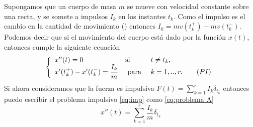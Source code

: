\begin{example} \label{ejemplo1}
    Supongamos que un cuerpo de masa $m$ se mueve con velocidad constante sobre una recta, y se somete a impulsos $I_k$ en los instantes $t_k$. Como el impulso es el cambio en la cantidad de movimiento (\cite{Serway}) entonces $I_k=mv(t_k^+)-mv(t_k^-)$. Podemos decir que si el movimiento del cuerpo está dado por la función $x(t)$, entonces cumple la siguiente ecuación 
    \begin{equation}
	\left\lbrace \begin{array}{lll} 
		\label{eq:imp}
        x''(t)=0 & \text{si }& t\neq t_k,\\
		x'(t_k^+)-x'(t_k^-)=\dfrac{I_k} {m} & \text{ para }& k=1,..,r.\tag{${PI}$}
	\end{array}\right. 
\end{equation}
Si ahora consideramos que la fuerza es impulsiva $F(t)=\displaystyle\sum_{k=1}^r I_k\delta_{t_k}$ entonces puedo escribir el problema impulsivo \ref{eq:imp} como  \ref{eq:problema A}
$$x''(t)=\sum_{k=1}^r\dfrac{I_k}{m}\delta_{t_k}$$
\end{example}







